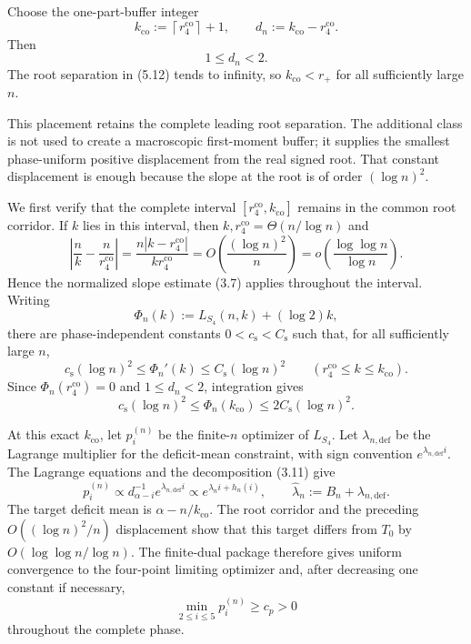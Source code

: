 
Choose the one-part-buffer integer
\begin{equation*}
  k_{\mathrm{co}}
  :=\left\lceil r_4^{\mathrm{co}}\right\rceil+1,
  \qquad
  d_n:=k_{\mathrm{co}}-r_4^{\mathrm{co}}.
  \tag{5.13}
\end{equation*}
Then
\[
  1\le d_n<2.
\]
The root separation in (5.12) tends to infinity, so
$k_{\mathrm{co}}<r_+$ for all sufficiently large $n$.

This placement retains the complete leading root separation.  The additional
class is not used to create a macroscopic first-moment buffer; it supplies the
smallest phase-uniform positive displacement from the real signed root.  That
constant displacement is enough because the slope at the root is of order
$(\log n)^2$.

We first verify that the complete interval
$[r_4^{\mathrm{co}},k_{\mathrm{co}}]$ remains in the common root corridor.  If
$k$ lies in this interval, then $k,r_4^{\mathrm{co}}=\Theta(n/\log n)$ and
\[
  \left|\frac nk-\frac{n}{r_4^{\mathrm{co}}}\right|
  =
  \frac{n|k-r_4^{\mathrm{co}}|}{k r_4^{\mathrm{co}}}
  =O\!\left(\frac{(\log n)^2}{n}\right)
  =o\!\left(\frac{\log\log n}{\log n}\right).
\]
Hence the normalized slope estimate (3.7) applies throughout the interval.
Writing
\[
  \Phi_n(k):=L_{S_4}(n,k)+(\log 2)k,
\]
there are phase-independent constants $0<c_{\mathrm s}<C_{\mathrm s}$ such
that, for all sufficiently large $n$,
\[
  c_{\mathrm s}(\log n)^2
  \le \Phi_n'(k)
  \le C_{\mathrm s}(\log n)^2
  \qquad
  (r_4^{\mathrm{co}}\le k\le k_{\mathrm{co}}).
\]
Since $\Phi_n(r_4^{\mathrm{co}})=0$ and $1\le d_n<2$, integration gives
\begin{equation*}
  c_{\mathrm s}(\log n)^2
  \le \Phi_n(k_{\mathrm{co}})
  \le 2C_{\mathrm s}(\log n)^2.
  \tag{5.13a}
\end{equation*}

At this exact $k_{\mathrm{co}}$, let $p_i^{(n)}$ be the finite-$n$ optimizer
of $L_{S_4}$.  Let $\lambda_{n,\mathrm{def}}$ be the Lagrange multiplier for
the deficit-mean constraint, with sign convention
$e^{\lambda_{n,\mathrm{def}}i}$.  The Lagrange equations and the decomposition
(3.11) give
\begin{equation*}
  p_i^{(n)}
  \propto d_{\alpha-i}^{-1}e^{\lambda_{n,\mathrm{def}}i}
  \propto e^{\widehat\lambda_n i+h_n(i)},
  \qquad
  \widehat\lambda_n:=B_n+\lambda_{n,\mathrm{def}}.
  \tag{5.14}
\end{equation*}
The target deficit mean is
$\alpha-n/k_{\mathrm{co}}$.  The root corridor and the preceding
$O((\log n)^2/n)$ displacement show that this target differs from $T_0$ by
$O(\log\log n/\log n)$.  The finite-dual package therefore gives uniform
convergence to the four-point limiting optimizer and, after decreasing one
constant if necessary,
\begin{equation*}
  \min_{2\le i\le5}p_i^{(n)}\ge c_p>0
  \tag{5.15}
\end{equation*}
throughout the complete phase.

